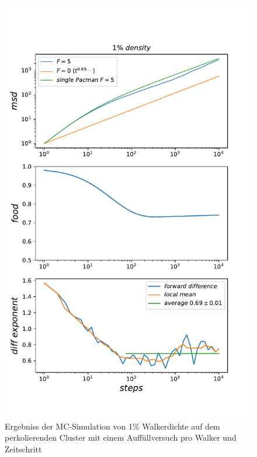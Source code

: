 \documentclass[a4paper, 12pt]{report}
\begin{document}
\begin{figure}[H]
	\centering
	\includegraphics[scale=0.75]{1percent_new_food_new.pdf}
	\caption{Ergebniss der MC-Simulation von 1\% Walkerdichte auf dem perkolierenden Cluster mit einem Auffüllversuch pro Walker und Zeitschritt}
\end{figure}
\end{document}
